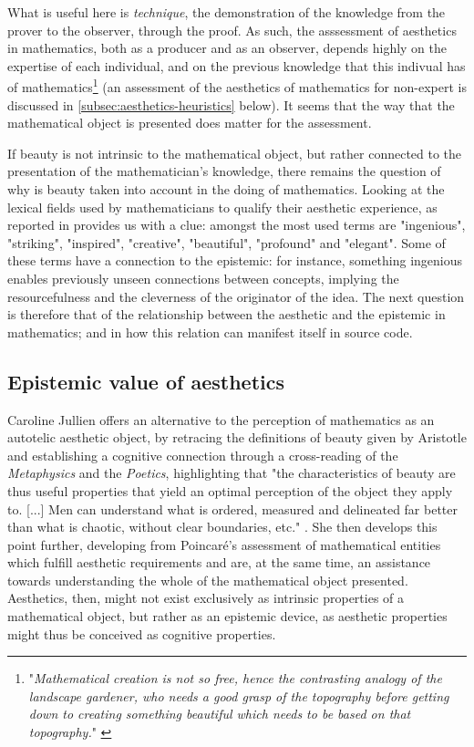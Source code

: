 What is useful here is \emph{technique}, the demonstration of the knowledge from the prover to the observer, through the proof. As such, the asssessment of aesthetics in mathematics, both as a producer and as an observer, depends highly on the expertise of each individual, and on the previous knowledge that this indivual has of mathematics\footnote{"\emph{Mathematical creation is not so free, hence the contrasting analogy of the landscape gardener, who needs a good grasp of the topography before getting down to creating something beautiful which needs to be based on that topography.}" \citep{thomas_beauty_2017}} \citep{thomas_beauty_2017} (an assessment of the aesthetics of mathematics for non-expert is discussed in \ref{subsec:aesthetics-heuristics} below). It seems that the way that the mathematical object is presented does matter for the assessment.

If beauty is not intrinsic to the mathematical object, but rather connected to the presentation of the mathematician's knowledge, there remains the question of why is beauty taken into account in the doing of mathematics. Looking at the lexical fields used by mathematicians to qualify their aesthetic experience, as reported in \citep{inglis_beauty_2015} provides us with a clue: amongst the most used terms are "ingenious", "striking", "inspired", "creative", "beautiful", "profound" and "elegant". Some of these terms have a connection to the epistemic: for instance, something ingenious enables previously unseen connections between concepts, implying the resourcefulness and the cleverness of the originator of the idea. The next question is therefore that of the relationship between the aesthetic and the epistemic in mathematics; and in how this relation can manifest itself in source code.

\subsection{Epistemic value of aesthetics}
\label{subsec:epistemic-aesthetics}

Caroline Jullien offers an alternative to the perception of mathematics as an autotelic aesthetic object, by retracing the definitions of beauty given by Aristotle and establishing a cognitive connection through a cross-reading of the \emph{Metaphysics} and the \emph{Poetics}, highlighting that "the characteristics of beauty are thus useful properties that yield an optimal perception of the object they apply to. [...] Men can understand what is ordered, measured and delineated far better than what is chaotic, without clear boundaries, etc." \citep{jullien_languages_2012}. She then develops this point further, developing from Poincaré's assessment of mathematical entities which fulfill aesthetic requirements and are, at the same time, an assistance towards understanding the whole of the mathematical object presented. Aesthetics, then, might not exist exclusively as intrinsic properties of a mathematical object, but rather as an epistemic device, as aesthetic properties might thus be conceived as cognitive properties.

